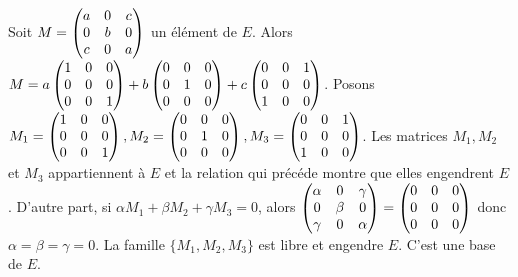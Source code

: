 {{Soit  $M= \begin{pmatrix} a & 0 & c \cr 0 & b & 0 \cr c & 0 & a
\cr \end{pmatrix} $  un \' el\' ement de  $E$.  Alors  $M=
 a\begin{pmatrix} 1 & 0 & 0 \cr
0 & 0 & 0 \cr 0 & 0 & 1 \cr \end{pmatrix} + b
\begin{pmatrix} 0 & 0 & 0 \cr
0 & 1 & 0 \cr 0 & 0 & 0 \cr \end{pmatrix}+c
 \begin{pmatrix} 0 & 0 & 1 \cr
0 & 0 & 0 \cr 1 & 0 & 0 \cr \end{pmatrix}
 $. Posons  $M_1=
 \begin{pmatrix} 1 & 0 & 0 \cr
0 & 0 & 0 \cr 0 & 0 & 1 \cr \end{pmatrix} ,  M_2=
\begin{pmatrix} 0 & 0 & 0 \cr
0 & 1 & 0 \cr 0 & 0 & 0 \cr \end{pmatrix} ,  M_3=
 \begin{pmatrix} 0 & 0 & 1 \cr
0 & 0 & 0 \cr 1 & 0 & 0 \cr \end{pmatrix}
 $.  Les matrices  $M_1 ,  M_2$  et  $M_3$  appartiennent \`a  $E$  et la relation qui pr\' ec\' ede
montre que  elles engendrent  $E$. D'autre part, si  $\alpha M_1 +
\beta M_2 + \gamma M_3 =0$, alors  $\begin{pmatrix} \alpha & 0 &
\gamma \cr 0 & \beta  & 0 \cr \gamma & 0 & \alpha \cr
\end{pmatrix} =\begin{pmatrix} 0 & 0 & 0 \cr 0 & 0 & 0 \cr 0 & 0 &
0 \cr \end{pmatrix} $  donc  $\alpha = \beta =\gamma =0$. La
famille  $\{ M_1 ,  M_2 , M_3 \}$  est libre et engendre  $E$.
C'est une base de  $E$.}
}